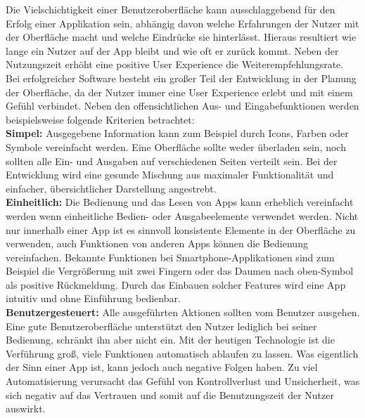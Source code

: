 Die Vielschichtigkeit einer Benutzeroberfläche kann ausschlaggebend für den Erfolg einer Applikation sein, abhängig davon welche Erfahrungen der Nutzer mit der Oberfläche macht und welche Eindrücke sie hinterlässt. Hieraus resultiert wie lange ein Nutzer auf der App bleibt und wie oft er zurück kommt. Neben der Nutzungszeit erhöht eine positive User Experience die Weiterempfehlungsrate.\\
Bei erfolgreicher Software besteht ein großer Teil der Entwicklung in der Planung der Oberfläche, da der Nutzer immer eine User Experience erlebt und mit einem Gefühl verbindet. Neben den offensichtlichen Aus- und Eingabefunktionen werden beispielsweise folgende Kriterien  betrachtet:\\

\noindent
{}
\textbf{Simpel:} Ausgegebene Information kann zum Beispiel durch Icons, Farben oder Symbole vereinfacht werden. Eine Oberfläche sollte weder überladen sein, noch sollten alle Ein- und Ausgaben auf verschiedenen Seiten verteilt sein. Bei der Entwicklung wird eine gesunde Mischung aus maximaler Funktionalität und einfacher, übersichtlicher Darstellung angestrebt.\\

\noindent
{}
\textbf{Einheitlich:} Die Bedienung und das Lesen von Apps kann erheblich vereinfacht werden wenn einheitliche Bedien- oder Ausgabeelemente verwendet werden. Nicht nur innerhalb einer App ist es sinnvoll konsistente Elemente in der Oberfläche zu verwenden, auch Funktionen von anderen Apps können die Bedienung vereinfachen. Bekannte Funktionen bei Smartphone-Applikationen sind zum Beispiel die Vergrößerung mit zwei Fingern oder das \glqq Daumen nach oben\grqq -Symbol als positive Rückmeldung. Durch das  Einbauen solcher Features wird eine App intuitiv und ohne Einführung bedienbar.\\

\noindent
{}
\textbf{Benutzergesteuert:} Alle ausgeführten Aktionen sollten vom Benutzer ausgehen. Eine gute Benutzeroberfläche unterstützt den Nutzer  lediglich bei seiner Bedienung, schränkt ihn aber nicht ein. Mit der heutigen Technologie ist die Verführung groß, viele Funktionen automatisch ablaufen zu lassen. Was eigentlich der Sinn einer App ist, kann jedoch auch negative Folgen haben. Zu viel Automatisierung verursacht das Gefühl von Kontrollverlust und Unsicherheit, was sich negativ auf das Vertrauen und somit auf die Benutzungszeit der Nutzer auswirkt. \\

